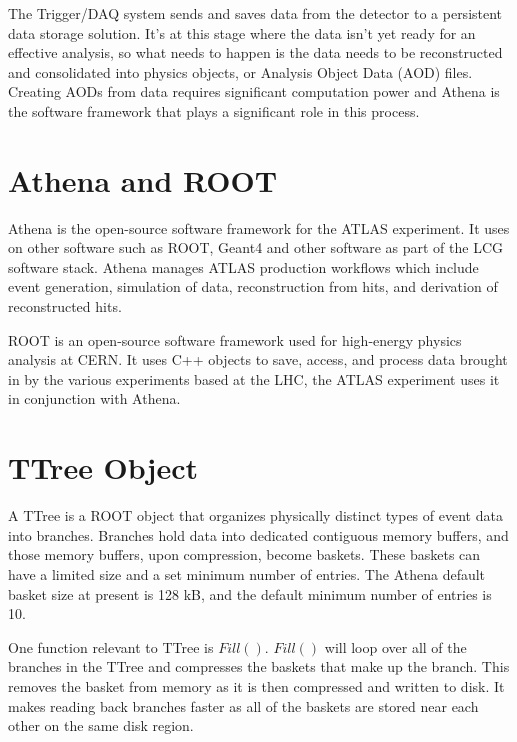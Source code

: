 The Trigger/DAQ system sends and saves data from the detector to a persistent data storage solution.
It's at this stage where the data isn't yet ready for an effective analysis, so what needs to happen is the data needs to be reconstructed and consolidated into physics objects, or Analysis Object Data (AOD) files.
Creating AODs from data requires significant computation power and Athena is the software framework that plays a significant role in this process.

\section{Athena and ROOT}
Athena is the open-source software framework for the ATLAS experiment.\cite{athena}
It uses on other software such as ROOT, Geant4 and other software as part of the LCG software stack. 
Athena manages ATLAS production workflows which include event generation, simulation of data, reconstruction from hits, and derivation of reconstructed hits.\cite{athenadocs}

ROOT is an open-source software framework used for high-energy physics analysis at CERN.\cite{ROOT_about} 
It uses C++ objects to save, access, and process data brought in by the various experiments based at the LHC, the ATLAS experiment uses it in conjunction with Athena.


\section{TTree Object} \label{section: ATLASIO_TTreeObject}
A TTree is a ROOT object that organizes physically distinct types of event data into branches.
Branches hold data into dedicated contiguous memory buffers, and those memory buffers, upon compression, become baskets.
These baskets can have a limited size and a set minimum number of entries. 
The Athena default basket size at present is 128 kB, and the default minimum number of entries is 10. 

One function relevant to TTree is $Fill()$. 
$Fill()$ will loop over all of the branches in the TTree and compresses the baskets that make up the branch.
This removes the basket from memory as it is then compressed and written to disk.
It makes reading back branches faster as all of the baskets are stored near each other on the same disk region. \cite{ROOT_TTree}
 

